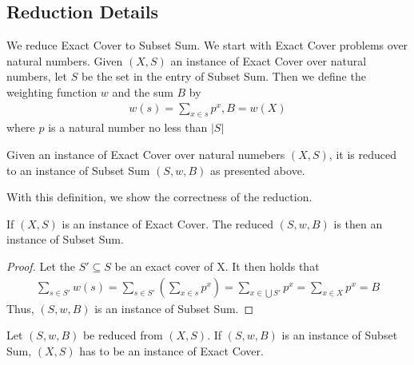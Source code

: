 \subsection{Reduction Details}
We reduce Exact Cover to Subset Sum. We start with Exact Cover problems over natural numbers. 
Given $(X, S)$ an instance of Exact Cover over natural numbers, let $S$ be the set in the entry of Subset Sum. Then we
define the weighting function $w$ and the sum $B$ by 
\begin{align*}
    w(s) = \sum_{x \in s} p^x , B = w(X)
\end{align*}
where $p$ is a natural number no less than $|S|$
\begin{definition}[Reduction XC to SS]
    Given an instance of Exact Cover over natural numebers $(X, S)$, 
    it is reduced to an instance of Subset Sum $(S, w, B)$ as presented above.
\end{definition}
With this definition, we show the correctness of the reduction.
\begin{lemma}[Soundness]
    If $(X, S)$ is an instance of Exact Cover. The reduced $(S, w, B)$ is then an instance of Subset Sum. 
\end{lemma}
\begin{proof}
    Let the $S' \subseteq S$ be an exact cover of X. It then holds that
\begin{align*}
    \sum_{s \in S'} w(s) = \sum_{s \in S'} (\sum_{x \in s} p^x) = \sum_{x \in \bigcup S'} p^x = \sum_{x \in X} p^x = B
\end{align*}
Thus, $(S, w, B)$ is an instance of Subset Sum. 
\end{proof}
\begin{lemma}[Completeness]
    Let $(S, w, B)$ be reduced from $(X, S)$. If $(S, w, B)$ is an instance of Subset Sum, 
    $(X, S)$ has to be an instance of Exact Cover. 
\end{lemma}
